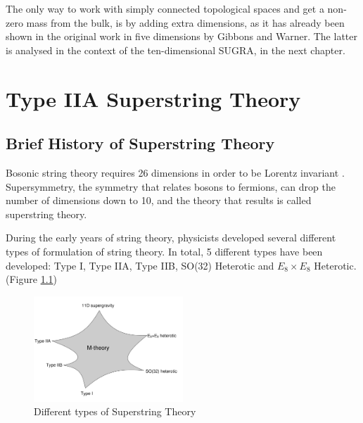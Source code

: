 \documentclass[a4paper,notitlepage]{report}
\begin{document}
The only way to work with simply connected topological spaces and get a non-zero mass from the bulk, is by adding extra dimensions, as it has already been shown in the original work in five dimensions by Gibbons and Warner. The latter is analysed in the context of the ten-dimensional SUGRA, in the next chapter.


\chapter{Type IIA Superstring Theory}

\section{Brief History of Superstring Theory }

Bosonic string theory requires 26 dimensions in order to be Lorentz invariant \cite{becker2006string,demystified2009demystified,green1987superstring,polchinski1998string2,polchinski1998string,schwarz2001introduction}. Supersymmetry, the symmetry that relates bosons to fermions, can drop the number of dimensions down to 10, and the theory that results is called superstring theory. 

During the early years of string theory, physicists developed several different types of formulation of string theory. In total, 5 different types have been developed: Type I, Type IIA, Type IIB, SO(32) Heterotic and $E_8\times E_8$ Heterotic. (Figure \ref{Mtheory})

\vspace{1.5em}

\begin{figure}[h!]
\centering
\includegraphics [width=0.5\textwidth]{Mtheory}
\caption{Different types of Superstring Theory}
\label{Mtheory}
\end{figure}

\vspace{1.5em}
\end{document}
